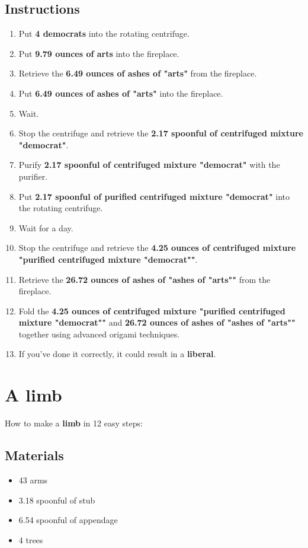 \documentclass{article}
\begin{document}
\subsection{Instructions}\begin{enumerate}
\item 
Put \textbf{4 democrats} into the rotating centrifuge.
\item 
Put \textbf{9.79 ounces of arts} into the fireplace.
\item 
Retrieve the \textbf{6.49 ounces of ashes of "arts"} from the fireplace.
\item 
Put \textbf{6.49 ounces of ashes of "arts"} into the fireplace.
\item 
Wait.
\item 
Stop the centrifuge and retrieve the \textbf{2.17 spoonful of centrifuged mixture "democrat"}.
\item 
Purify \textbf{2.17 spoonful of centrifuged mixture "democrat"} with the purifier.
\item 
Put \textbf{2.17 spoonful of purified centrifuged mixture "democrat"} into the rotating centrifuge.
\item 
Wait for a day.
\item 
Stop the centrifuge and retrieve the \textbf{4.25 ounces of centrifuged mixture "purified centrifuged mixture "democrat""}.
\item 
Retrieve the \textbf{26.72 ounces of ashes of "ashes of "arts""} from the fireplace.
\item 
Fold the \textbf{4.25 ounces of centrifuged mixture "purified centrifuged mixture "democrat""} and \textbf{26.72 ounces of ashes of "ashes of "arts""} together using advanced origami techniques.
\item 
If you've done it correctly, it could result in a \textbf{liberal}.
\end{enumerate}
\newpage
\section{A limb}How to make a \textbf{limb} in 12 easy steps:

\subsection{Materials}\begin{itemize}
\item 
43 arms
\item 
3.18 spoonful of stub
\item 
6.54 spoonful of appendage
\item 
4 trees
\end{itemize}
\end{document}

